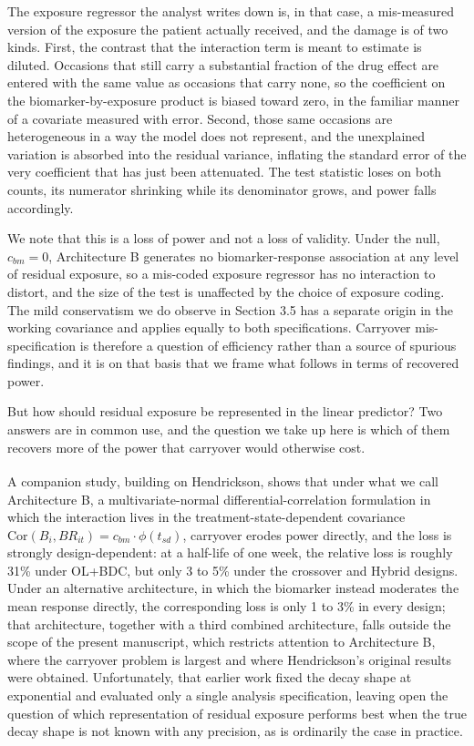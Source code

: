 \documentclass[
  11pt,
]{article}
\newcounter{none} %
\begin{document}
The exposure regressor the analyst writes down is, in that case, a
mis-measured version of the exposure the patient actually received,
and the damage is of two kinds. First, the contrast that the
interaction term is meant to estimate is diluted. Occasions that
still carry a substantial fraction of the drug effect are entered
with the same value as occasions that carry none, so the coefficient
on the biomarker-by-exposure product is biased toward zero, in the
familiar manner of a covariate measured with error. Second, those
same occasions are heterogeneous in a way the model does not
represent, and the unexplained variation is absorbed into the
residual variance, inflating the standard error of the very
coefficient that has just been attenuated. The test statistic loses
on both counts, its numerator shrinking while its denominator grows,
and power falls accordingly.

We note that this is a loss of power and not a loss of validity.
Under the null, \(c_{bm} = 0\), Architecture B generates no
biomarker-response association at any level of residual exposure, so
a mis-coded exposure regressor has no interaction to distort, and the
size of the test is unaffected by the choice of exposure coding. The
mild conservatism we do observe in Section 3.5 has a separate origin
in the working covariance and applies equally to both specifications.
Carryover mis-specification is therefore a question of efficiency
rather than a source of spurious findings, and it is on that basis
that we frame what follows in terms of recovered power.

But how should residual exposure be represented in the linear
predictor? Two answers are in common use, and the question we take up
here is which of them recovers more of the power that carryover would
otherwise cost.

A companion study\textsuperscript{}, building on
Hendrickson\textsuperscript{}, shows that under what we call
Architecture B, a multivariate-normal differential-correlation
formulation in which the interaction lives in the
treatment-state-dependent covariance
\(\text{Cor}(B_i, BR_{it}) = c_{bm} \cdot \phi(t_{sd})\), carryover
erodes power directly, and the loss is strongly design-dependent: at
a half-life of one week, the relative loss is roughly 31\% under
OL+BDC, but only 3 to 5\% under the crossover and Hybrid designs.
Under an alternative architecture, in which the biomarker instead
moderates the mean response directly, the corresponding loss is only
1 to 3\% in every design; that architecture, together with a third
combined architecture, falls outside the scope of the present
manuscript,
which restricts attention to Architecture B, where the carryover
problem is largest and where Hendrickson's original results were
obtained. Unfortunately, that earlier work fixed the decay shape at
exponential and evaluated only a single analysis specification,
leaving open the question of which representation of residual
exposure performs best when the true decay shape is not known with
any precision, as is ordinarily the case in practice.
\end{document}
